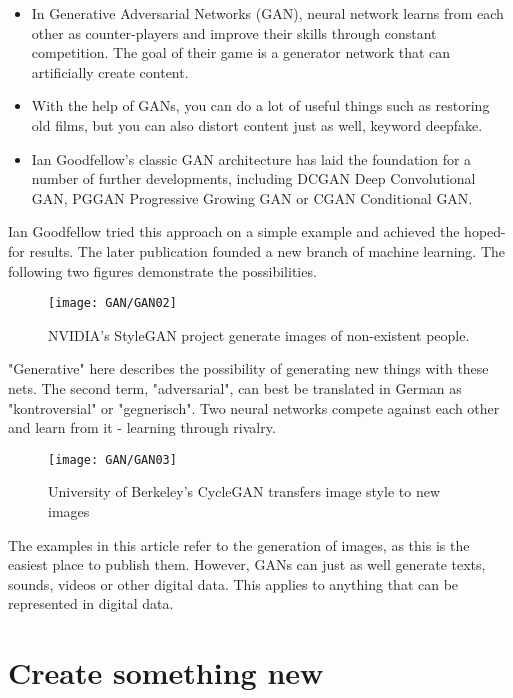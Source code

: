 \begin{itemize}
  \item In Generative Adversarial Networks (GAN), neural network learns from each other as counter-players and improve their skills through constant competition. The goal of their game is a generator network that can artificially create content.
  \item With the help of GANs, you can do a lot of useful things such as restoring old films, but you can also distort content just as well, keyword deepfake.
  \item Ian Goodfellow's classic GAN architecture has laid the foundation for a number of further developments, including DCGAN Deep Convolutional GAN, PGGAN Progressive Growing GAN or CGAN Conditional GAN.
\end{itemize}

Ian Goodfellow tried this approach on a simple example and achieved the hoped-for results. The later publication  founded a new branch of machine learning. The following two figures demonstrate the possibilities.


\begin{figure}
  \texttt{[image: GAN/GAN02]}
  \caption{NVIDIA's StyleGAN project generate images of non-existent people.} 
  \label{GAN02}
\end{figure}


"Generative" here describes the possibility of generating new things with these nets. The second term, "adversarial", can best be translated in German as "kontroversial" or "gegnerisch". Two neural networks compete against each other and learn from it - learning through rivalry.

\begin{figure}
  \texttt{[image: GAN/GAN03]}
  \caption{University of Berkeley's CycleGAN transfers image style to new images} 
  \label{GAN03}
\end{figure}


The examples in this article refer to the generation of images, as this is the easiest place to publish them. However, GANs can just as well generate texts, sounds, videos or other digital data. This applies to anything that can be represented in digital data.

\section{Create something new}

